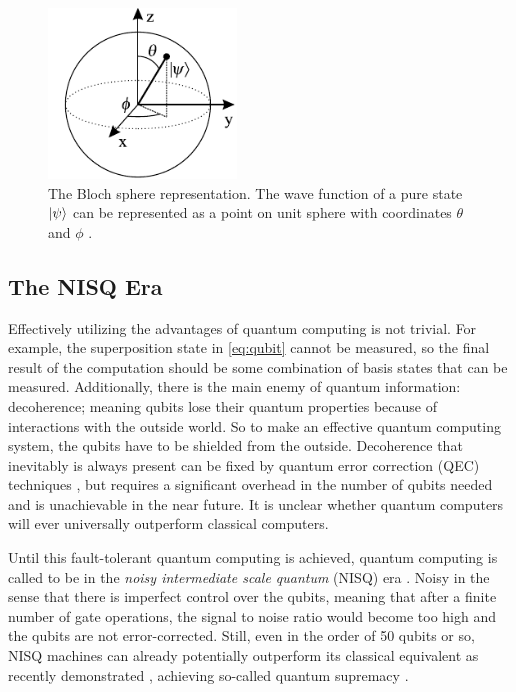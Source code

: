 \begin{figure}
	\centering
	\includegraphics[width=5cm]{figures/BlochSphereCropped.pdf}
	\caption{The Bloch sphere representation. The wave function of a pure state $\lvert\psi\rangle$ can be represented as a point on unit sphere with coordinates $\theta$ and $\phi$ \cite{Jones2012}.}
	\label{fig:BlochSphere}
\end{figure}

\subsection{The NISQ Era}

Effectively utilizing the advantages of quantum computing is not trivial. For example, the superposition state in \cref{eq:qubit} cannot be measured, so the final result of the computation should be some combination of basis states that can be measured. Additionally, there is the main enemy of quantum information: decoherence; meaning qubits lose their quantum properties because of interactions with the outside world. So to make an effective quantum computing system, the qubits have to be shielded from the outside. Decoherence that inevitably is always present can be fixed by quantum error correction (QEC) techniques \cite{Ladd2010,Preskill2018}, but requires a significant overhead in the number of qubits needed \cite{Gottesman2009,Preskill2018} and is unachievable in the near future. It is unclear whether quantum computers will ever universally outperform classical computers.

Until this fault-tolerant quantum computing is achieved, quantum computing is called to be in the \textit{noisy intermediate scale quantum} (NISQ) era \cite{Preskill2018}. Noisy in the sense that there is imperfect control over the qubits, meaning that after a finite number of gate operations, the signal to noise ratio would become too high and the qubits are not error-corrected. Still, even in the order of 50 qubits or so, NISQ machines can already potentially outperform its classical equivalent as recently demonstrated \cite{Arute2019}, achieving so-called quantum supremacy \cite{Preskill2012}.

